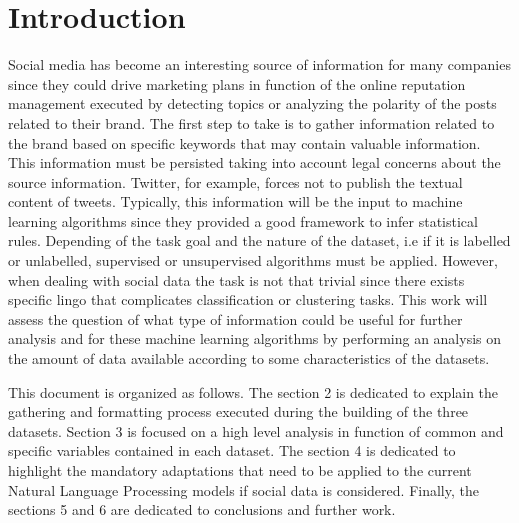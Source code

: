 \section{Introduction}
\par Social media has become an interesting source of information for many companies since they could drive marketing plans in function of the online reputation management executed by detecting topics or analyzing the polarity of the posts related to their brand. The first step to take is to gather information related to the brand based on specific keywords that may contain valuable information. This information must be persisted taking into account legal concerns about the source information. Twitter, for example, forces not to publish the textual content of tweets. Typically, this information will be the input to machine learning algorithms since they provided a good framework to infer statistical rules. Depending of the task goal and the nature of the dataset, i.e if it is labelled or unlabelled, supervised or unsupervised algorithms must be applied. However, when dealing with social data the task is not that trivial since there exists specific lingo that complicates classification or clustering tasks. This work will assess the question of what type of information could be useful for further analysis and for these machine learning algorithms by performing an analysis on the amount of data available according to some characteristics of the datasets.

\par This document is organized as follows. The section 2 is dedicated to explain the gathering and formatting process executed during the building of the three datasets. Section 3 is focused on a high level analysis in function of common and specific variables contained in each dataset. The section 4 is dedicated to highlight the mandatory adaptations that need to be applied to the current Natural Language Processing models if social data is considered. Finally, the sections 5 and 6 are dedicated to conclusions and further work.
